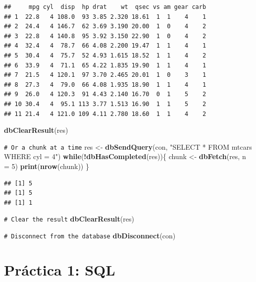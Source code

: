 \documentclass[
]{book}
\newenvironment{Shaded}{\begin{snugshade}}{\end{snugshade}}
\newcommand{\AttributeTok}[1]{\textcolor[rgb]{0.13,0.29,0.53}{#1}}
\newcommand{\CommentTok}[1]{\textcolor[rgb]{0.56,0.35,0.01}{\textit{#1}}}
\newcommand{\ControlFlowTok}[1]{\textcolor[rgb]{0.13,0.29,0.53}{\textbf{#1}}}
\newcommand{\DecValTok}[1]{\textcolor[rgb]{0.00,0.00,0.81}{#1}}
\newcommand{\FunctionTok}[1]{\textcolor[rgb]{0.13,0.29,0.53}{\textbf{#1}}}
\newcommand{\NormalTok}[1]{#1}
\newcommand{\OtherTok}[1]{\textcolor[rgb]{0.56,0.35,0.01}{#1}}
\newcommand{\SpecialCharTok}[1]{\textcolor[rgb]{0.81,0.36,0.00}{\textbf{#1}}}
\newcommand{\StringTok}[1]{\textcolor[rgb]{0.31,0.60,0.02}{#1}}
\theoremstyle{break}
\theoremstyle{nonumberplain}
\renewcommand{\CommentTok}[1]{\textcolor[rgb]{0.41,0.41,0.41}{\texttt{#1}}}
\begin{document}
\begin{verbatim}
##     mpg cyl  disp  hp drat    wt  qsec vs am gear carb
## 1  22.8   4 108.0  93 3.85 2.320 18.61  1  1    4    1
## 2  24.4   4 146.7  62 3.69 3.190 20.00  1  0    4    2
## 3  22.8   4 140.8  95 3.92 3.150 22.90  1  0    4    2
## 4  32.4   4  78.7  66 4.08 2.200 19.47  1  1    4    1
## 5  30.4   4  75.7  52 4.93 1.615 18.52  1  1    4    2
## 6  33.9   4  71.1  65 4.22 1.835 19.90  1  1    4    1
## 7  21.5   4 120.1  97 3.70 2.465 20.01  1  0    3    1
## 8  27.3   4  79.0  66 4.08 1.935 18.90  1  1    4    1
## 9  26.0   4 120.3  91 4.43 2.140 16.70  0  1    5    2
## 10 30.4   4  95.1 113 3.77 1.513 16.90  1  1    5    2
## 11 21.4   4 121.0 109 4.11 2.780 18.60  1  1    4    2
\end{verbatim}

\begin{Shaded}
\begin{Highlighting}[]
\FunctionTok{dbClearResult}\NormalTok{(res)}

\CommentTok{\# Or a chunk at a time}
\NormalTok{res }\OtherTok{\textless{}{-}} \FunctionTok{dbSendQuery}\NormalTok{(con, }\StringTok{"SELECT * FROM mtcars WHERE cyl = 4"}\NormalTok{)}
\ControlFlowTok{while}\NormalTok{(}\SpecialCharTok{!}\FunctionTok{dbHasCompleted}\NormalTok{(res))\{}
\NormalTok{  chunk }\OtherTok{\textless{}{-}} \FunctionTok{dbFetch}\NormalTok{(res, }\AttributeTok{n =} \DecValTok{5}\NormalTok{)}
  \FunctionTok{print}\NormalTok{(}\FunctionTok{nrow}\NormalTok{(chunk))}
\NormalTok{\}}
\end{Highlighting}
\end{Shaded}

\begin{verbatim}
## [1] 5
## [1] 5
## [1] 1
\end{verbatim}

\begin{Shaded}
\begin{Highlighting}[]
\CommentTok{\# Clear the result}
\FunctionTok{dbClearResult}\NormalTok{(res)}

\CommentTok{\# Disconnect from the database}
\FunctionTok{dbDisconnect}\NormalTok{(con)}
\end{Highlighting}
\end{Shaded}

\section{Práctica 1: SQL}\label{pruxe1ctica-1-sql}
\end{document}
